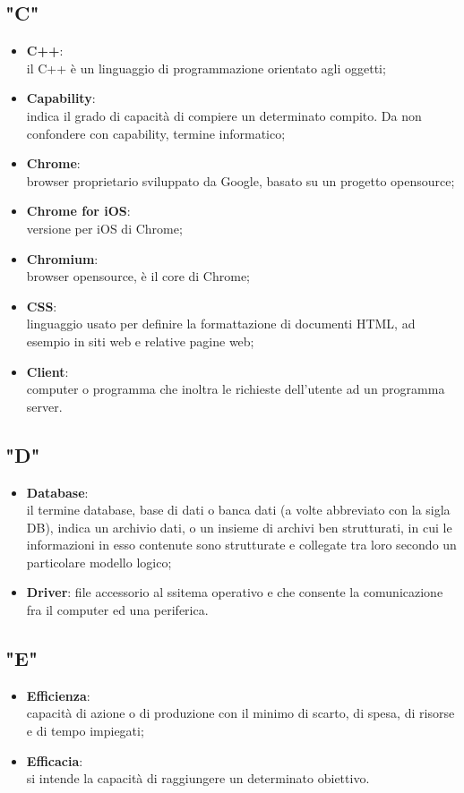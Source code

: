 \subsection{"C"}
\begin{itemize}
\item \textbf{C++}:\\ il C++ è un linguaggio di programmazione orientato agli oggetti;
\item \textbf{Capability}:\\ indica il grado di capacità di compiere un determinato compito. Da non confondere con capability, termine informatico;
\item \textbf{Chrome}:\\ browser proprietario sviluppato da Google, basato su un progetto opensource;
\item \textbf{Chrome for iOS}:\\ versione per iOS di Chrome;
\item \textbf{Chromium}:\\ browser opensource, è il core di Chrome;
\item \textbf{CSS}:\\ linguaggio usato per definire la formattazione di documenti HTML, ad esempio in siti web e relative pagine web;
\item \textbf{Client}:\\ computer o programma che inoltra le richieste dell’utente ad un programma server.
\end{itemize}

\subsection{"D"}
\begin{itemize}
\item \textbf{Database}:\\ il termine database, base di dati o banca dati (a volte abbreviato con la sigla DB), indica un archivio dati, o un insieme di archivi ben strutturati, in cui le informazioni in esso contenute sono strutturate e collegate tra loro secondo un particolare modello logico;
\item \textbf{Driver}: file accessorio al ssitema operativo e che consente la comunicazione fra il computer ed una periferica.
\end{itemize}

\subsection{"E"}
\begin{itemize}
\item \textbf{Efficienza}:\\ capacità di azione o di produzione con il minimo di scarto, di spesa, di risorse e di tempo impiegati; 
\item \textbf{Efficacia}:\\ si intende la capacità di raggiungere un determinato obiettivo.
\end{itemize}

